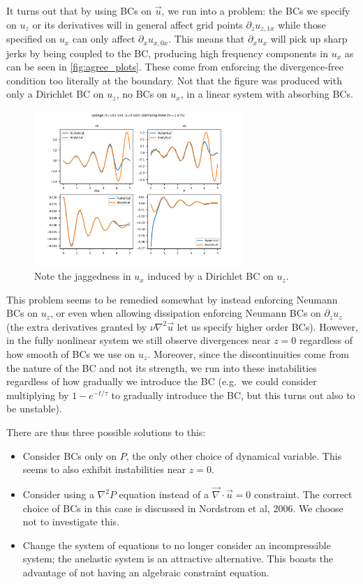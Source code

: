 \documentclass[11pt,
        usenames, %
        dvipsnames %
    ]{report}
\begin{document}
It turns out that by using BCs on $\vec{u}$, we run into a problem: the BCs we
specify on $u_z$ or its derivatives will in general affect grid points
$\partial_z u_{z, 1x}$ while those specified on $u_x$ can only affect
$\partial_x u_{x, 0x}$. This means that $\partial_x u_x$ will pick up
sharp jerks by being coupled to the BC, producing high frequency components in
$u_x$ as can be seen in \autoref{fig:agree_plots}. These come from enforcing the
divergence-free condition too literally at the boundary. Not that the figure was
produced with only a Dirichlet BC on $u_z$, no BCs on $u_x$, in a linear system
with absorbing BCs.
\begin{figure}[!h]
    \centering
    \includegraphics[width=0.7\textwidth]{plots/sponge_2.png}
    \caption{Note the jaggedness in $u_x$ induced by a Dirichlet BC on
    $u_z$.}\label{fig:agree_plots}
\end{figure}

This problem seems to be remedied somewhat by instead enforcing Neumann BCs on
$u_z$, or even when allowing dissipation enforcing Neumann BCs on $\partial_z
u_z$ (the extra derivatives granted by $\nu \nabla^2 \vec{u}$ let us specify
higher order BCs). However, in the fully nonlinear system we still observe
divergences near $z=0$ regardless of how smooth of BCs we use on $u_z$.
Moreover, since the discontinuities come from the nature of the BC and not its
strength, we run into these instabilities regardless of how gradually we
introduce the BC (e.g.\ we could consider multiplying by $1 - e^{-t/\tau}$ to
gradually introduce the BC, but this turns out also to be unstable).

There are thus three possible solutions to this:
\begin{itemize}
    \item Consider BCs only on $P$, the only other choice of dynamical variable.
        This seems to also exhibit instabilities near $z = 0$.

    \item Consider using a $\nabla^2 P$ equation instead of a $\vec{\nabla}
        \cdot \vec{u} = 0$ constraint. The correct choice of BCs in this case is
        discussed in Nordstrom et al, 2006. We choose not to investigate this.

    \item Change the system of equations to no longer consider an incompressible
        system; the anelastic system is an attractive alternative. This boasts
        the advantage of not having an algebraic constraint equation.
\end{itemize}
\end{document}
